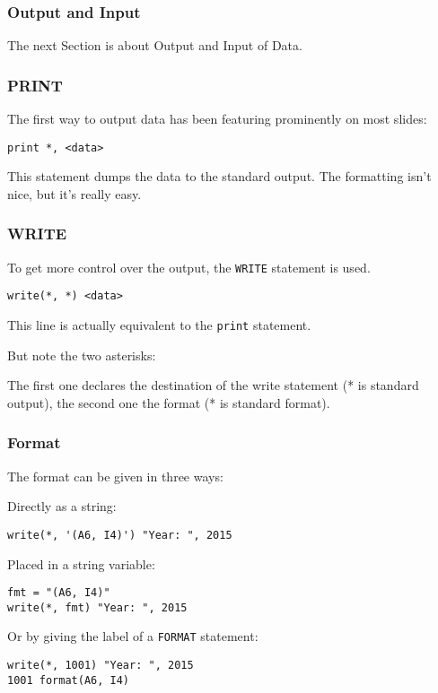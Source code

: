 \begin{frame}[fragile]
  \frametitle{Output and Input}

  The next Section is about Output and Input of Data.

\end{frame}

\begin{frame}[fragile]
  \frametitle{PRINT}

  The first way to output data has been featuring prominently
  on most slides:

  \begin{lstlisting}[numbers=none]
print *, <data>
  \end{lstlisting}

  This statement dumps the data to the standard output.
  The formatting isn't nice, but it's really easy.

\end{frame}

\begin{frame}[fragile]
  \frametitle{WRITE}

  To get more control over the output, the \texttt{WRITE}
  statement is used.

  \begin{lstlisting}[numbers=none]
write(*, *) <data>
  \end{lstlisting}

  This line is actually equivalent to the \texttt{print} statement.

  But note the two asterisks:

  The first one declares the destination of the write statement (* is standard output),
  the second one the format (* is standard format).

\end{frame}

\begin{frame}[fragile]
  \frametitle{Format}

  The format can be given in three ways:
  
  Directly as a string:
  \begin{lstlisting}
write(*, '(A6, I4)') "Year: ", 2015
  \end{lstlisting}

  Placed in a string variable:
  \begin{lstlisting}
fmt = "(A6, I4)"
write(*, fmt) "Year: ", 2015
  \end{lstlisting}

  Or by giving the label of a \texttt{FORMAT} statement:
  \begin{lstlisting}
write(*, 1001) "Year: ", 2015
1001 format(A6, I4)
  \end{lstlisting}

\end{frame}

